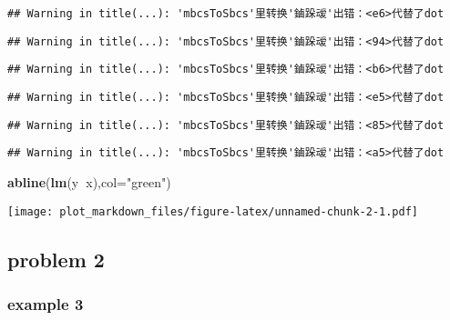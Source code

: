 \documentclass[]{article}
\newenvironment{Shaded}{\begin{snugshade}}{\end{snugshade}}
\newcommand{\KeywordTok}[1]{\textcolor[rgb]{0.13,0.29,0.53}{\textbf{#1}}}
\newcommand{\DataTypeTok}[1]{\textcolor[rgb]{0.13,0.29,0.53}{#1}}
\newcommand{\StringTok}[1]{\textcolor[rgb]{0.31,0.60,0.02}{#1}}
\newcommand{\OperatorTok}[1]{\textcolor[rgb]{0.81,0.36,0.00}{\textbf{#1}}}
\newcommand{\NormalTok}[1]{#1}
\begin{document}
\begin{verbatim}
## Warning in title(...): 'mbcsToSbcs'里转换'鏀跺叆'出错：<e6>代替了dot
\end{verbatim}

\begin{verbatim}
## Warning in title(...): 'mbcsToSbcs'里转换'鏀跺叆'出错：<94>代替了dot
\end{verbatim}

\begin{verbatim}
## Warning in title(...): 'mbcsToSbcs'里转换'鏀跺叆'出错：<b6>代替了dot
\end{verbatim}

\begin{verbatim}
## Warning in title(...): 'mbcsToSbcs'里转换'鏀跺叆'出错：<e5>代替了dot
\end{verbatim}

\begin{verbatim}
## Warning in title(...): 'mbcsToSbcs'里转换'鏀跺叆'出错：<85>代替了dot
\end{verbatim}

\begin{verbatim}
## Warning in title(...): 'mbcsToSbcs'里转换'鏀跺叆'出错：<a5>代替了dot
\end{verbatim}

\begin{Shaded}
\begin{Highlighting}[]
\KeywordTok{abline}\NormalTok{(}\KeywordTok{lm}\NormalTok{(y}\OperatorTok{~}\NormalTok{x),}\DataTypeTok{col=}\StringTok{"green"}\NormalTok{)}
\end{Highlighting}
\end{Shaded}

\texttt{[image: plot\_markdown\_files/figure-latex/unnamed-chunk-2-1.pdf]}

\subsection{problem 2}\label{problem-2}

\subsubsection{example 3}\label{example-3}
\end{document}
